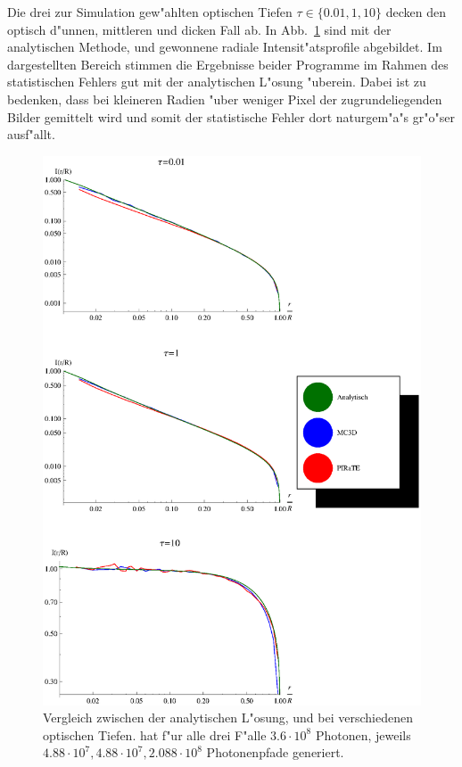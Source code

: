	Die drei zur Simulation gew"ahlten optischen Tiefen $\tau\in\{0.01,1,10\}$ decken den optisch d"unnen, mittleren und dicken Fall ab.	In Abb.~\ref{fig:methodcomparisongraphics} sind mit der analytischen Methode, \mctd und \pirate gewonnene radiale Intensit"atsprofile abgebildet.
	Im dargestellten Bereich stimmen die Ergebnisse beider Programme im Rahmen des statistischen Fehlers gut mit der analytischen L"osung "uberein. Dabei ist zu bedenken, dass bei kleineren Radien "uber weniger Pixel der zugrundeliegenden Bilder gemittelt wird und somit der statistische Fehler dort naturgem"a"s gr"o"ser ausf"allt.
		\begin{figure}
			\centering
			\includegraphics[height=1.0\textheight]{methodcomparisongraphics.eps}
			\caption{Vergleich zwischen der analytischen L"osung, \mctd und \pirate bei verschiedenen optischen Tiefen. \mctd hat f"ur alle drei F"alle $3.6\cdot10^8$ Photonen, \pirate jeweils $4.88\cdot10^7,4.88\cdot10^7,2.088\cdot10^8$ Photonenpfade generiert.}
			\label{fig:methodcomparisongraphics}
		\end{figure}
	
